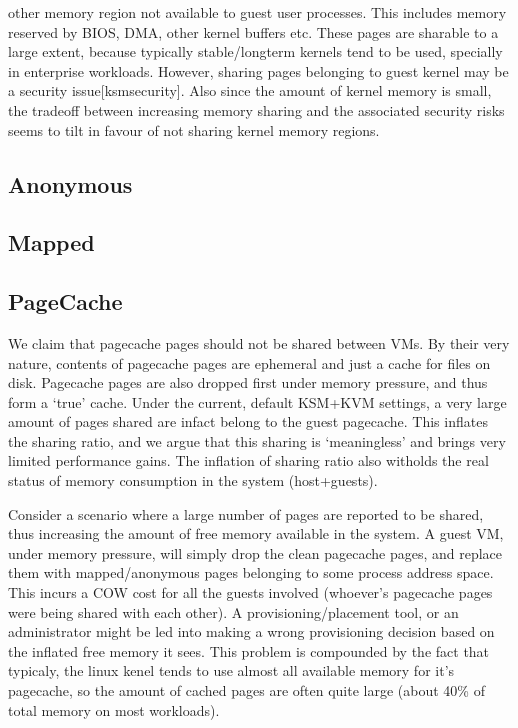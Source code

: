 \documentclass[10pt,a4paper]{article}
\begin{document}
other memory region not available to guest user processes. This includes
memory reserved by BIOS, DMA, other kernel buffers etc. 
These pages are sharable to a large extent, because typically
stable/longterm kernels tend to be used, specially in enterprise
workloads. 
However, sharing pages belonging to guest kernel may be a security
issue[ksmsecurity].
Also since the amount of kernel memory is small, the tradeoff between
increasing memory sharing and the associated security risks seems to
tilt in favour of not sharing kernel memory regions.

\subsection{Anonymous}

        
\subsection{Mapped}


\subsection{PageCache}

We claim that pagecache pages should not be shared between VMs. By
their very nature, contents of pagecache pages are ephemeral and just
a cache for files on disk. Pagecache pages are also dropped first
under memory pressure, and thus form a `true' cache. Under the
current, default KSM+KVM settings, a very large amount of pages shared
are infact belong to the guest pagecache. This inflates the sharing
ratio, and we argue that this sharing is `meaningless' and brings very
limited performance gains. The inflation of sharing ratio also
witholds the real status of memory consumption in the system
(host+guests).

Consider a scenario where a large number of pages are reported to be
shared, thus increasing the amount of free memory available in the
system.
A guest VM, under memory pressure, will simply drop the clean
pagecache pages, and replace them with mapped/anonymous pages
belonging to some process address space. 
This incurs a COW cost for all the guests involved (whoever's
pagecache pages were being shared with each other). 
A provisioning/placement tool, or an administrator might be
led into making a wrong provisioning decision based on the inflated
free memory it sees. 
This problem is compounded by the fact that typicaly, the linux kenel
tends to use almost all available memory for it's pagecache, so the
amount of cached pages are often quite large (about 40\% of total
memory on most workloads). 
\end{document}
